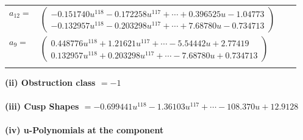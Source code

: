 \documentclass[1p]{elsarticle_modified}
\theoremstyle{definition}
\begin{document}
\begin{tabular}{m{7pt} m{180pt} m{7pt} m{180pt} }
\flushright $a_{12}=$&$\begin{pmatrix}-0.151740 u^{118}-0.172258 u^{117}+\cdots+0.396525 u-1.04773\\-0.132957 u^{118}-0.203298 u^{117}+\cdots+7.68780 u-0.734713\end{pmatrix}$ \\
\flushright $a_{9}=$&$\begin{pmatrix}0.448776 u^{118}+1.21621 u^{117}+\cdots-5.54442 u+2.77419\\0.132957 u^{118}+0.203298 u^{117}+\cdots-7.68780 u+0.734713\end{pmatrix}$\\&\end{tabular}
\flushleft \textbf{(ii) Obstruction class $= -1$}\\~\\
\flushleft \textbf{(iii) Cusp Shapes $= -0.699441 u^{118}-1.36103 u^{117}+\cdots-108.370 u+12.9128$}\\~\\
\newpage\renewcommand{\arraystretch}{1}
\flushleft \textbf{(iv) u-Polynomials at the component}\newline \\
\end{document}
